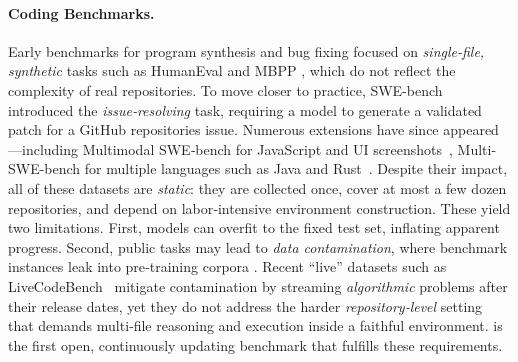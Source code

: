 \paragraph{Coding Benchmarks.}
Early benchmarks for program synthesis and bug fixing focused on \emph{single‑file, synthetic} tasks such as HumanEval \cite{chen2021evaluating} and MBPP \cite{austin2021program}, which do not reflect the complexity of real repositories.  To move closer to practice, SWE-bench~\cite{swebench} introduced the \emph{issue‐resolving} task, requiring a model to generate a validated patch for a GitHub repositories issue.  Numerous extensions have since appeared—including Multimodal SWE‑bench for JavaScript and UI screenshots~\cite{yang2024swebenchmultimodalaisystems}, Multi-SWE-bench for multiple languages such as Java and Rust~\cite{zan2025multi}.  Despite their impact, all of these datasets are \emph{static}: they are collected once, cover at most a few dozen repositories, and depend on labor‑intensive environment construction.  These yield two limitations. First, models can overfit to the fixed test set, inflating apparent progress.   Second, public tasks may lead to \textit{data contamination}, where benchmark instances leak into pre‑training corpora \cite{zhang2024careful, golchin2023time}.
Recent ``live'' datasets such as LiveCodeBench~\cite{jain2024livecodebench} mitigate contamination by streaming \emph{algorithmic} problems after their release dates, yet they do not address the harder \emph{repository‑level} setting that demands multi‑file reasoning and execution inside a faithful environment. \benchmark is the first open, continuously updating benchmark that fulfills these requirements. 

